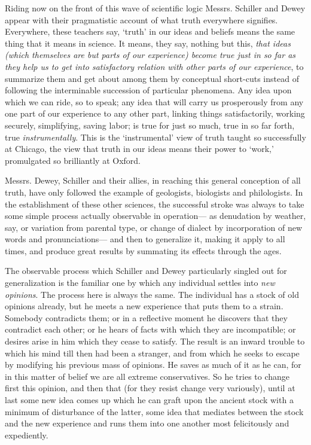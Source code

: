 \documentclass[]{article}
\begin{document}
Riding now on the front of this wave of scientific logic Messrs.
Schiller and Dewey appear with their pragmatistic account of what truth
everywhere signifies. Everywhere, these teachers say, `truth' in our
ideas and beliefs means the same thing that it means in science. It
means, they say, nothing but this, \emph{that ideas (which themselves are but
parts of our experience) become true just in so far as they help us to
get into satisfactory relation with other parts of our experience}, to
summarize them and get about among them by conceptual short-cuts instead
of following the interminable succession of particular phenomena. Any
idea upon which we can ride, so to speak; any idea that will carry us
prosperously from any one part of our experience to any other part,
linking things satisfactorily, working securely, simplifying,
saving labor; is true for just so much, true in so far forth, true
\emph{instrumentally}. This is the `instrumental' view of truth taught so
successfully at Chicago, the view that truth in our ideas means their
power to `work,' promulgated so brilliantly at Oxford.

Messrs. Dewey, Schiller and their allies, in reaching this general
conception of all truth, have only followed the example of geologists,
biologists and philologists. In the establishment of these other
sciences, the successful stroke was always to take some simple process
actually observable in operation--- as denudation by weather, say, or
variation from parental type, or change of dialect by incorporation of
new words and pronunciations--- and then to generalize it, making it apply
to all times, and produce great results by summating its effects through
the ages.

The observable process which Schiller and Dewey particularly singled out
for generalization is the familiar one by which any individual settles
into \emph{new opinions}. The process here is always the same. The individual
has a stock of old opinions already, but he meets a new experience that
puts them to a strain. Somebody contradicts them; or in a reflective
moment he discovers that they contradict each other; or he hears of
facts with which they are incompatible; or desires arise in him which
they cease to satisfy. The result is an inward trouble to which his
mind till then had been a stranger, and from which he seeks to escape
by modifying his previous mass of opinions. He saves as much of it as he
can, for in this matter of belief we are all extreme conservatives. So
he tries to change first this opinion, and then that (for they resist
change very variously), until at last some new idea comes up which he
can graft upon the ancient stock with a minimum of disturbance of the
latter, some idea that mediates between the stock and the new experience
and runs them into one another most felicitously and expediently.
\end{document}
